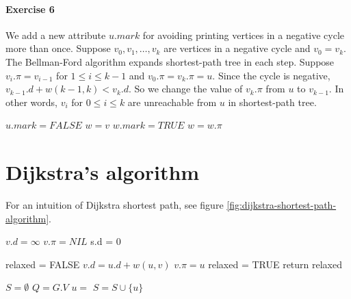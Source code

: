 \documentclass{book}
\begin{document}
	\paragraph{Exercise 6}
	We add a new attribute $u.mark$ for avoiding printing vertices in a negative cycle more than once. Suppose $v_0, v_1, \dots, v_k$ are vertices in a negative cycle and $v_0 = v_k$. The Bellman-Ford algorithm expands shortest-path tree in each step. Suppose $v_i.\pi = v_{i - 1}$ for $1 \le i \le k - 1$ and $v_0.\pi = v_k.\pi = u$. Since the cycle is negative, $v_{k - 1}.d + w(k - 1, k) < v_k.d$. So we change the value of $v_k.\pi$ from $u$ to $v_{k - 1}$. In other words, $v_i$ for $0 \le i \le k$ are unreachable from $u$ in shortest-path tree.
	\begin{algorithm*}[h!]
		\begin{algorithmic}[1]
				\State {}
						\State {}
					\EndFor
				\EndFor
					\State $u.mark = FALSE$
				\EndFor
						\State $w = v$
							\State $w.mark = TRUE$
							\State {}
							\State $w = w.\pi$
						\EndWhile
					\EndIf
				\EndFor
			\EndFunction
		\end{algorithmic}
	\end{algorithm*}
	\FloatBarrier	
	\section{Dijkstra's algorithm}
	For an intuition of Dijkstra shortest path, see figure \ref{fig:dijkstra-shortest-path-algorithm}.
	
	
		\begin{algorithm*}[h!]
			\begin{algorithmic}[1]
						\State $v.d = \infty$
						\State $v.\pi = NIL$
					\EndFor
					\State s.d = 0
				\EndFunction
			\end{algorithmic}
			
			\begin{algorithmic}[1]
					\State relaxed = FALSE
						\State $v.d = u.d + w(u, v)$
						\State $v.\pi = u$
						\State relaxed = TRUE
					\EndIf
					\State return relaxed
				\EndFunction
			\end{algorithmic}
	
			\begin{algorithmic}[1]
					\State {}
					\State $S = \emptyset$
					\State $Q = G.V$
					\While{$Q \ne \emptyset$}
						\State $u=$ 
						\State $S = S \cup \{u\}$
							\State {}
						\EndFor
					\EndWhile
				\EndFunction
			\end{algorithmic}		
		\end{algorithm*}
		\FloatBarrier
	
\end{document}
